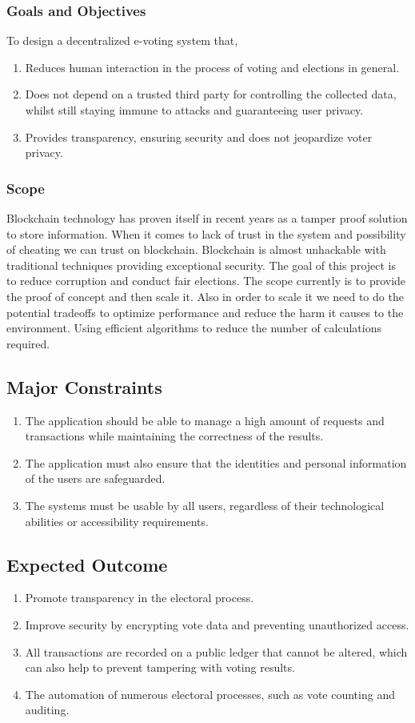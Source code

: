 \documentclass[oneside, 12pt]{book}
\begin{document}
\subsubsection{Goals and Objectives}
To design a decentralized e-voting system that,
\begin{enumerate}
	\item Reduces human interaction in the process of voting and elections in general.
	\item Does not depend on a trusted third party for controlling the collected data, whilst still staying immune to attacks and guaranteeing user privacy.
	\item Provides transparency, ensuring security and does not jeopardize voter privacy.
\end{enumerate}
\subsubsection{Scope}
Blockchain technology has proven itself in recent years as a tamper proof solution to store information. When it comes to lack of trust in the system and possibility of cheating we can trust on blockchain. Blockchain is almost unhackable with traditional techniques providing exceptional security. The goal of this project is to reduce corruption and conduct fair elections. The scope currently is to provide the proof of concept and then scale it. Also in order to scale it we need to do the potential tradeoffs to optimize performance and reduce the harm it causes to the environment. Using efficient algorithms to reduce the number of calculations required.
\subsection{Major Constraints}
\begin{enumerate}
	\item The application should be able to manage a high amount of requests and transactions while maintaining the correctness of the results.
	\item The application must also ensure that the identities and personal information of the users are safeguarded.
	\item The systems must be usable by all users, regardless of their technological abilities or accessibility requirements.
\end{enumerate}
\subsection{Expected Outcome}
\begin{enumerate}
	\item Promote transparency in the electoral process.
	\item Improve security by encrypting vote data and preventing unauthorized access.
	\item All transactions are recorded on a public ledger that cannot be altered, which can also help to prevent tampering with voting results.
	\item The automation of numerous electoral processes, such as vote counting and auditing.
\end{enumerate}
\end{document}
